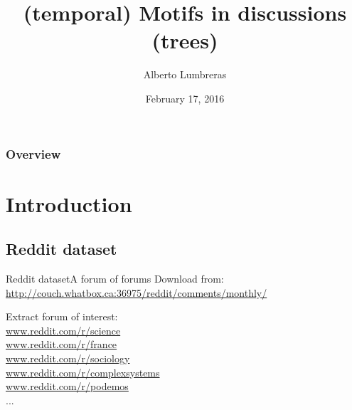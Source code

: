 \documentclass{beamer}
\begin{document}

	
\title{(temporal) Motifs in discussions (trees)}
\author{Alberto Lumbreras}
\date{February 17, 2016}
\maketitle

\begin{frame}\frametitle{Overview} 
\begin{NoHyper}
\tableofcontents
\end{NoHyper}
\end{frame}

\section{Introduction}
\subsection{Reddit dataset}

\begin{frame}{Reddit dataset}{A forum of forums}
	Download from:
	\href{http://couch.whatbox.ca:36975/reddit/comments/monthly/}{http://couch.whatbox.ca:36975/reddit/comments/monthly/}
	
	\vfill
	Extract forum of interest:\\
	\href{www.reddit.com/r/podemos}{www.reddit.com/r/{\color{red}science}}\\
	\href{www.reddit.com/r/podemos}{www.reddit.com/r/{\color{red}france}}\\
	\href{www.reddit.com/r/podemos}{www.reddit.com/r/{\color{red}sociology}}\\
	\href{www.reddit.com/r/podemos}{www.reddit.com/r/{\color{red}complexsystems}}\\
	\href{www.reddit.com/r/podemos}{www.reddit.com/r/{\color{red}podemos}}\\
	...
\end{frame}
\end{document}
